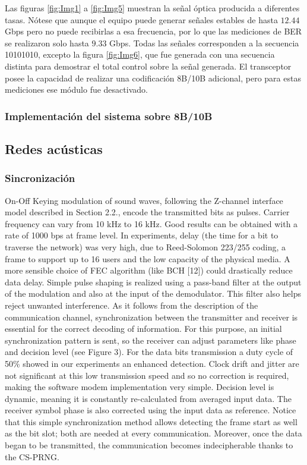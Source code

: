 \documentclass[a4paper,10pt]{report}
\begin{document}
Las figuras \ref{fig:Img1} a \ref{fig:Img5} muestran la señal óptica producida a diferentes
tasas. Nótese que aunque el equipo puede generar señales estables de
hasta $12.44$ Gbps pero no puede recibirlas a esa frecuencia, por lo que las
mediciones de BER se realizaron solo hasta $9.33$ Gbps. Todas las señales
corresponden a la secuencia 10101010, excepto la figura \ref{fig:Img6},
que fue generada con una secuencia distinta para demostrar el total
control sobre la señal generada. El transceptor posee la capacidad de
realizar una codificación 8B/10B adicional, pero para estas mediciones
ese módulo fue desactivado.



\subsubsection{Implementación del sistema sobre 8B/10B}
\subsection{Redes acústicas}
\subsubsection{Sincronización}
On-Off Keying modulation of sound waves, following the Z-channel interface model described in Section 2.2., encode the transmitted bits as pulses. Carrier frequency can vary from 10 kHz to 16 kHz. Good results can be obtained with a rate of 1000 bps at frame level. In experiments, delay (the time for a bit to traverse the network) was very high, due to Reed-Solomon 223/255 coding, a frame to support up to 16 users and the low capacity of the physical media. A more sensible choice of FEC algorithm (like BCH [12]) could drastically reduce data delay. Simple pulse shaping is realized using a pass-band filter at the output of the modulation and also at the input of the demodulator. This filter also helps reject unwanted interference.
As it follows from the description of the communication channel, synchronization between the transmitter and receiver is essential for the correct decoding of information. For this purpose, an initial synchronization pattern is sent, so the receiver can adjust parameters like phase and decision level (see Figure 3). For the data bits transmission a duty cycle of 50\% showed in our experiments an enhanced detection. Clock drift and jitter are not significant at this low transmission speed and so no correction is required, making the software modem implementation very simple. Decision level is dynamic, meaning it is constantly re-calculated from averaged input data. The receiver symbol phase is also corrected using the input data as reference. Notice that this simple synchronization method allows detecting the frame start as well as the bit slot; both are needed at every communication. Moreover, once the data began to be transmitted, the communication becomes indecipherable thanks to the CS-PRNG.
\end{document}
